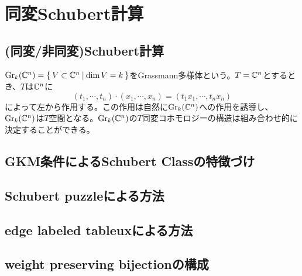 \section{同変Schubert計算}
\subsection{(同変/非同変)Schubert計算}
$\text{Gr}_k(\mathbb{C}^n)=\left\{\:V\subset \mathbb{C}^n\:\middle|\:\dim V = k\:\right\}$をGrassmann多様体という。$T=\mathbb{C}^n$とするとき、$T$は$\mathbb{C}^n$に
\[
(t_1,\cdots,t_n)\cdot(x_1,\cdots,x_n)=(t_1x_1,\cdots,t_nx_n)
\]
によって左から作用する。この作用は自然に$\text{Gr}_k(\mathbb{C}^n)$への作用を誘導し、$\text{Gr}_k(\mathbb{C}^n)$は$T$空間となる。$\text{Gr}_k(\mathbb{C}^n)$の$T$同変コホモロジーの構造は組み合わせ的に決定することができる。




\subsection{GKM条件によるSchubert Classの特徴づけ}



\subsection{Schubert puzzleによる方法}

\subsection{edge labeled tableuxによる方法}

\subsection{weight preserving bijectionの構成}